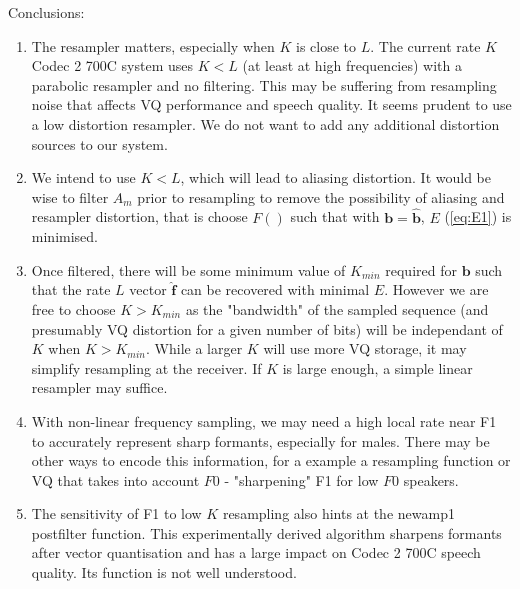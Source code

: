 \documentclass{article}
\begin{document}
Conclusions:
\begin{enumerate}
\item The resampler matters, especially when $K$ is close to $L$.  The current rate $K$ Codec 2 700C system uses $K < L$ (at least at high frequencies) with a parabolic resampler and no filtering.  This may be suffering from resampling noise that affects VQ performance and speech quality. It seems prudent to use a low distortion resampler.  We do not want to add any additional distortion sources to our system.

\item We intend to use $K<L$, which will lead to aliasing distortion.  It would be wise to filter $A_{m}$ prior to resampling to remove the possibility of aliasing and resampler distortion, that is choose $F()$ such that with $\mathbf{b}=\hat{\mathbf{b}}$, $E$ (\ref{eq:E1}) is minimised.

\item Once filtered, there will be some minimum value of $K_{min}$ required for $\mathbf{b}$ such that the rate $L$ vector $\hat{\mathbf{f}}$ can be recovered with minimal $E$. However we are free to choose $K>K_{min}$ as the "bandwidth" of the sampled sequence (and presumably VQ distortion for a given number of bits) will be independant of $K$ when $K>K_{min}$.  While a larger $K$ will use more VQ storage, it may simplify resampling at the receiver.  If $K$ is large enough, a simple linear resampler may suffice.

\item With non-linear frequency sampling, we may need a high local rate near F1 to accurately represent sharp formants, especially for males.  There may be other ways to encode this information, for a example a resampling function or VQ that takes into account $F0$ - "sharpening" F1 for low $F0$ speakers.

\item The sensitivity of F1 to low $K$ resampling also hints at the newamp1 postfilter function.  This experimentally derived algorithm sharpens formants after vector quantisation and has a large impact on Codec 2 700C speech quality.  Its function is not well understood.

\end{enumerate}
\end{document}
